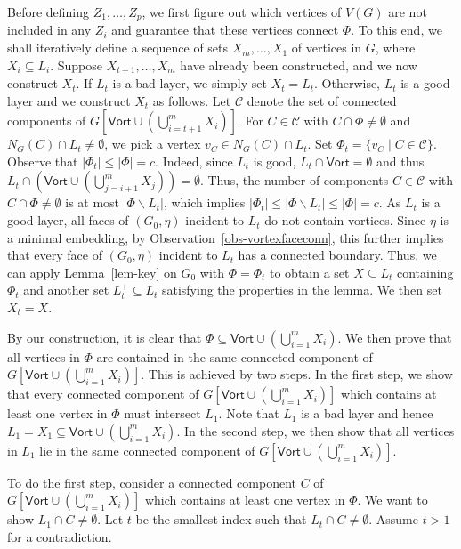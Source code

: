 \documentclass[a4paper,11pt]{article}
\numberwithin{lemma}{section}
\begin{document}
Before defining $Z_1,\dots,Z_p$, we first figure out which vertices of $V(G)$ are not included in any $Z_i$ and guarantee that these vertices connect $\varPhi$.
To this end, we shall iteratively define a sequence of sets $X_m,\dots,X_1$ of vertices in $G$, where $X_i \subseteq L_i$.
Suppose $X_{t+1},\dots,X_m$ have already been constructed, and we now construct $X_t$.
If $L_t$ is a bad layer, we simply set $X_t = L_t$.
Otherwise, $L_t$ is a good layer and we construct $X_t$ as follows.
Let $\mathcal{C}$ denote the set of connected components of $G[\mathsf{Vort} \cup (\bigcup_{i=t+1}^m X_i)]$.
For $C \in \mathcal{C}$ with $C \cap \varPhi \neq \emptyset$ and $N_G(C) \cap L_t \neq \emptyset$, we pick a vertex $v_C \in N_G(C) \cap L_t$.
Set $\varPhi_t = \{v_C \mid C \in \mathcal{C}\}$.
Observe that $|\varPhi_t| \leq |\varPhi| = c$.
Indeed, since $L_t$ is good, $L_t \cap \mathsf{Vort} = \emptyset$ and thus $L_t \cap (\mathsf{Vort} \cup (\bigcup_{j=i+1}^m X_j)) = \emptyset$.
Thus, the number of components $C \in \mathcal{C}$ with $C \cap \varPhi \neq \emptyset$ is at most $|\varPhi \backslash L_t|$, which implies $|\varPhi_t| \leq |\varPhi \backslash L_t| \leq |\varPhi| = c$.
As $L_t$ is a good layer, all faces of $(G_0,\eta)$ incident to $L_t$ do not contain vortices.
Since $\eta$ is a minimal embedding, by Observation~\ref{obs-vortexfaceconn}, this further implies that every face of $(G_0,\eta)$ incident to $L_t$ has a connected boundary.
Thus, we can apply Lemma~\ref{lem-key} on $G_0$ with $\varPhi = \varPhi_t$ to obtain a set $X \subseteq L_t$ containing $\varPhi_t$ and another set $L_t^+ \subseteq L_t$ satisfying the properties in the lemma.
We then set $X_t = X$.

By our construction, it is clear that $\varPhi \subseteq \mathsf{Vort} \cup (\bigcup_{i=1}^m X_i)$.
We then prove that all vertices in $\varPhi$ are contained in the same connected component of $G[\mathsf{Vort} \cup (\bigcup_{i=1}^m X_i)]$.
This is achieved by two steps.
In the first step, we show that every connected component of $G[\mathsf{Vort} \cup (\bigcup_{i=1}^m X_i)]$ which contains at least one vertex in $\varPhi$ must intersect $L_1$.
Note that $L_1$ is a bad layer and hence $L_1 = X_1 \subseteq \mathsf{Vort} \cup (\bigcup_{i=1}^m X_i)$.
In the second step, we then show that all vertices in $L_1$ lie in the same connected component of $G[\mathsf{Vort} \cup (\bigcup_{i=1}^m X_i)]$.

To do the first step, consider a connected component $C$ of $G[\mathsf{Vort} \cup (\bigcup_{i=1}^m X_i)]$ which contains at least one vertex in $\varPhi$.
We want to show $L_1 \cap C \neq \emptyset$.
Let $t$ be the smallest index such that $L_t \cap C \neq \emptyset$.
Assume $t>1$ for a contradiction.
\end{document}
